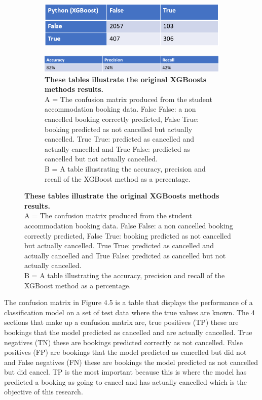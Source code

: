 \begin{figure}[H]
 \centering
  \begin{subfigure}{A\textwidth}
    \includegraphics[width=10cm]{figures/python_xgboost.png}
  \end{subfigure}

  \centering
  \begin{subfigure}{B\textwidth}
    \includegraphics[width=10cm]{figures/python_recall}
    \caption{\textbf{These tables illustrate the original XGBoosts methods results.}\vspace{2mm} \\ A = The confusion matrix produced from the student accommodation booking data. False False: a non cancelled booking correctly predicted, False True: booking predicted as not cancelled but actually cancelled. True True: predicted as cancelled and actually cancelled and True False: predicted as cancelled but not actually cancelled.\vspace{2mm} \\B = A table illustrating the accuracy, precision and recall of the XGBoost method as a percentage.} \label{fig:1b}
  \end{subfigure}
\end{figure}

The confusion matrix in Figure 4.5 is a table that displays the performance of a classification model on a set of test data where the true values are known. The 4 sections that make up a confusion matrix are, true positives (TP) these are bookings that the model predicted as cancelled and are actually cancelled. True negatives (TN) these are bookings predicted correctly as not cancelled. False positives (FP) are bookings that the model predicted as cancelled but did not and False negatives (FN) these are bookings the model predicted as not cancelled but did cancel. TP is the most important because this is where the model has predicted a booking as going  to cancel and has actually cancelled which is the objective of this research.

\vspace{5mm}

